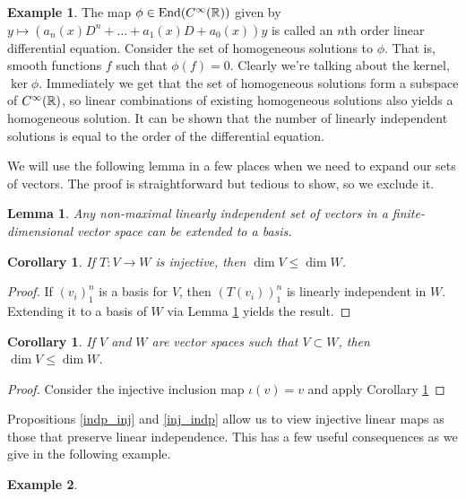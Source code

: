 \documentclass[12pt]{article}
\theoremstyle{definition}
\newtheorem{example}{Example}[section]
\theoremstyle{plain}
\newtheorem{corollary}[theorem]{Corollary}
\newtheorem{lemma}[theorem]{Lemma}
\numberwithin{equation}{section}
\theoremstyle{definition}
\begin{document}
\begin{example}
The map $ \phi \in \operatorname{End}(C^\infty(\operatorname{\mathbb{R}})) $ given by $ y \mapsto (a_n(x)D^n + \ldots + a_1(x)D + a_0(x))y $ is called an $ n $th order linear differential equation. Consider the set of homogeneous solutions to $ \phi $. That is, smooth functions $ f $ such that $ \phi(f) = 0 $. Clearly we're talking about the kernel, $ \ker \phi $. Immediately we get that the set of homogeneous solutions form a subspace of $ C^\infty(\operatorname{\mathbb{R}}) $, so linear combinations of existing homogeneous solutions also yields a homogeneous solution. It can be shown that the number of linearly independent solutions is equal to the order of the differential equation. 


\end{example}

We will use the following lemma in a few places when we need to expand our sets of vectors. The proof is straightforward but tedious to show, so we exclude it.

\begin{lemma} \label{extend}
Any non-maximal linearly independent set of vectors in a finite-dimensional vector space can be extended to a basis.
\end{lemma}

\begin{corollary} \label{inj_dim}
If $ T : V \to W $ is injective, then $ \dim V \leq \dim W $.
\end{corollary}

\begin{proof}
If $ (v_i)_1^n $ is a basis for $ V $, then $ (T(v_i))_1^n $ is linearly independent in $ W $. Extending it to a basis of $ W $ via Lemma \ref{extend} yields the result.
\end{proof}

\begin{corollary}
If $ V $ and $ W $ are vector spaces such that $ V \subset W $, then $ \dim V \leq \dim W $.
\end{corollary}

\begin{proof}
Consider the injective inclusion map $ \iota (v) = v $ and apply Corollary \ref{inj_dim}
\end{proof}

Propositions \ref{indp_inj} and \ref{inj_indp} allow us to view injective linear maps as those that preserve linear independence. This has a few useful consequences as we give in the following example.

\begin{example}

\end{example}
\end{document}
